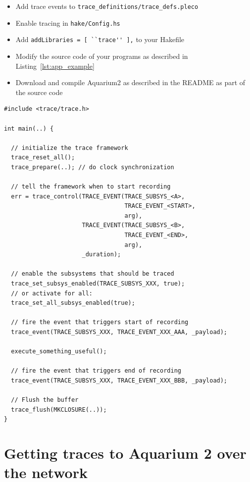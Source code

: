\documentclass[a4paper,11pt,twoside]{report}
\begin{document}
\begin{itemize}
\item Add trace events to \lstinline{trace_definitions/trace_defs.pleco}
\item Enable tracing in \lstinline{hake/Config.hs}
\item Add \lstinline{addLibraries = [ ``trace'' ],} to your Hakefile
\item Modify the source code of your programs as described in
  Listing~\ref{lst:app_example}
\item Download and compile Aquarium2 as described in the README as
  part of the source code
\end{itemize}
\clearpage
\begin{code}
\begin{lstlisting}[frame=single, caption={Enable tracing for an application}, label={lst:app_example}]
#include <trace/trace.h>

int main(..) {

  // initialize the trace framework
  trace_reset_all();
  trace_prepare(..); // do clock synchronization

  // tell the framework when to start recording
  err = trace_control(TRACE_EVENT(TRACE_SUBSYS_<A>,
                                  TRACE_EVENT_<START>,
                                  arg),
                      TRACE_EVENT(TRACE_SUBSYS_<B>,
                                  TRACE_EVENT_<END>,
                                  arg),
                      _duration);

  // enable the subsystems that should be traced
  trace_set_subsys_enabled(TRACE_SUBSYS_XXX, true);
  // or activate for all:
  trace_set_all_subsys_enabled(true);

  // fire the event that triggers start of recording
  trace_event(TRACE_SUBSYS_XXX, TRACE_EVENT_XXX_AAA, _payload);

  execute_something_useful();

  // fire the event that triggers end of recording
  trace_event(TRACE_SUBSYS_XXX, TRACE_EVENT_XXX_BBB, _payload);

  // Flush the buffer
  trace_flush(MKCLOSURE(..));
}
\end{lstlisting}
\end{code}

\section{Getting traces to Aquarium 2 over the network}
\end{document}
